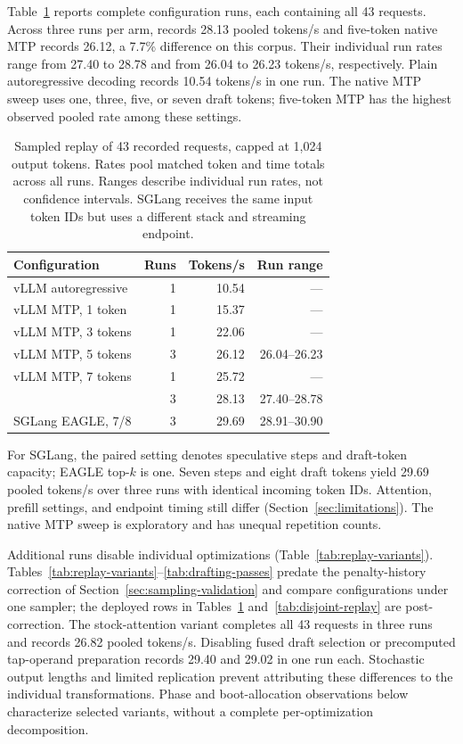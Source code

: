 Table~\ref{tab:request-replay} reports complete configuration runs, each containing all 43 requests. Across three runs per arm, \sys{} records 28.13 pooled tokens/s and five-token native MTP records 26.12, a 7.7\% difference on this corpus. Their individual run rates range from 27.40 to 28.78 and from 26.04 to 26.23 tokens/s, respectively. Plain autoregressive decoding records 10.54 tokens/s in one run. The native MTP sweep uses one, three, five, or seven draft tokens; five-token MTP has the highest observed pooled rate among these settings.

\begin{table}[t]
\caption{Sampled replay of 43 recorded requests, capped at 1,024 output tokens. Rates pool matched token and time totals across all runs. Ranges describe individual run rates, not confidence intervals. SGLang receives the same input token IDs but uses a different stack and streaming endpoint.}
\label{tab:request-replay}
\centering\small
\begin{tabular}{@{}lrrr@{}}
\toprule
Configuration & Runs & Tokens/s & Run range \\
\midrule
vLLM autoregressive & 1 & 10.54 & --- \\
vLLM MTP, 1 token & 1 & 15.37 & --- \\
vLLM MTP, 3 tokens & 1 & 22.06 & --- \\
vLLM MTP, 5 tokens & 3 & 26.12 & 26.04--26.23 \\
vLLM MTP, 7 tokens & 1 & 25.72 & --- \\
\sys{} & 3 & 28.13 & 27.40--28.78 \\
\midrule
SGLang EAGLE, 7/8 & 3 & 29.69 & 28.91--30.90 \\
\bottomrule
\end{tabular}
\end{table}

For SGLang, the paired setting denotes speculative steps and draft-token capacity; EAGLE top-$k$ is one. Seven steps and eight draft tokens yield 29.69 pooled tokens/s over three runs with identical incoming token IDs. Attention, prefill settings, and endpoint timing still differ (Section~\ref{sec:limitations}). The native MTP sweep is exploratory and has unequal repetition counts.

Additional runs disable individual \sys{} optimizations (Table~\ref{tab:replay-variants}). Tables~\ref{tab:replay-variants}--\ref{tab:drafting-passes} predate the penalty-history correction of Section~\ref{sec:sampling-validation} and compare configurations under one sampler; the deployed rows in Tables~\ref{tab:request-replay} and~\ref{tab:disjoint-replay} are post-correction. The stock-attention variant completes all 43 requests in three runs and records 26.82 pooled tokens/s. Disabling fused draft selection or precomputed tap-operand preparation records 29.40 and 29.02 in one run each. Stochastic output lengths and limited replication prevent attributing these differences to the individual transformations. Phase and boot-allocation observations below characterize selected variants, without a complete per-optimization decomposition.

